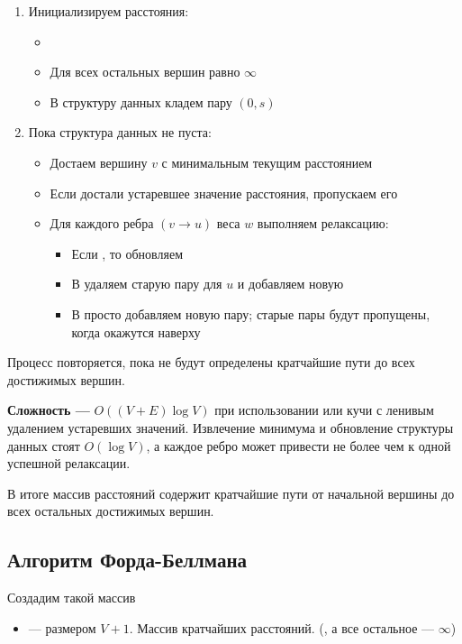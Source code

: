 \documentclass[a4paper]{article}
\begin{document}
\begin{enumerate}
    \item Инициализируем расстояния:
    \begin{itemize}
        \item {}
        \item Для всех остальных вершин  равно $\infty$
        \item В структуру данных кладем пару $(0, s)$
    \end{itemize}
    \item Пока структура данных не пуста:
    \begin{itemize}
        \item Достаем вершину $v$ с минимальным текущим расстоянием
        \item Если достали устаревшее значение расстояния, пропускаем его
        \item Для каждого ребра $(v\to u)$ веса $w$ выполняем релаксацию:
        \begin{itemize}
            \item Если , то обновляем 
            \item В  удаляем старую пару для $u$ и добавляем новую
            \item В  просто добавляем новую пару; старые пары будут пропущены, когда окажутся наверху
        \end{itemize}
    \end{itemize}
\end{enumerate}

Процесс повторяется, пока не будут определены кратчайшие пути до всех достижимых вершин.

\textbf{Сложность —} $O((V+E)\log V)$ при использовании  или кучи с ленивым удалением устаревших значений. Извлечение минимума и обновление структуры данных стоят $O(\log V)$, а каждое ребро может привести не более чем к одной успешной релаксации.

В итоге массив расстояний содержит кратчайшие пути от начальной вершины до всех остальных достижимых вершин.


\subsection{Алгоритм Форда-Беллмана}
Создадим такой массив

\begin{itemize}
    \item {} — размером $V+1$. Массив кратчайших расстояний. (, а все остальное — $\infty$)
\end{itemize}
\end{document}
